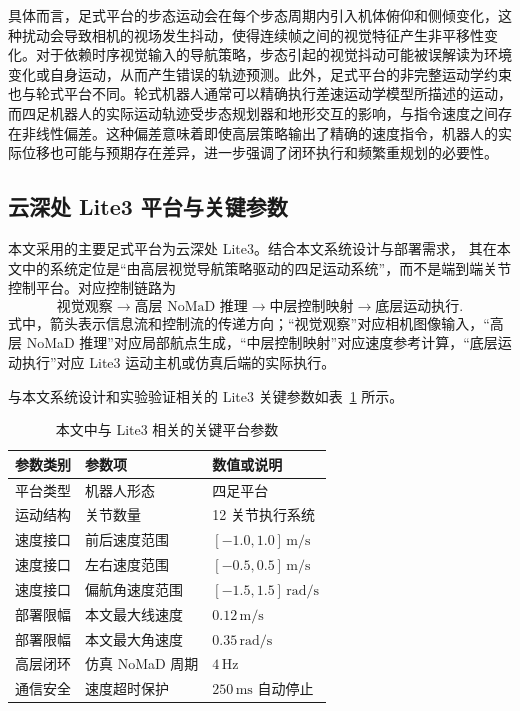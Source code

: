 具体而言，足式平台的步态运动会在每个步态周期内引入机体俯仰和侧倾变化，这种扰动会导致相机的视场发生抖动，使得连续帧之间的视觉特征产生非平移性变化。对于依赖时序视觉输入的导航策略，步态引起的视觉抖动可能被误解读为环境变化或自身运动，从而产生错误的轨迹预测。此外，足式平台的非完整运动学约束也与轮式平台不同。轮式机器人通常可以精确执行差速运动学模型所描述的运动，而四足机器人的实际运动轨迹受步态规划器和地形交互的影响，与指令速度之间存在非线性偏差。这种偏差意味着即使高层策略输出了精确的速度指令，机器人的实际位移也可能与预期存在差异，进一步强调了闭环执行和频繁重规划的必要性。


\subsection{云深处 Lite3 平台与关键参数}

本文采用的主要足式平台为云深处 Lite3。结合本文系统设计与部署需求，
其在本文中的系统定位是``由高层视觉导航策略驱动的四足运动系统''，而不是端到端关节控制平台。对应控制链路为
\begin{equation}
\text{视觉观察} \rightarrow \text{高层 NoMaD 推理} \rightarrow \text{中层控制映射} \rightarrow \text{底层运动执行}.
\end{equation}
式中，箭头表示信息流和控制流的传递方向；“视觉观察”对应相机图像输入，“高层 NoMaD 推理”对应局部航点生成，“中层控制映射”对应速度参考计算，“底层运动执行”对应 Lite3 运动主机或仿真后端的实际执行。

与本文系统设计和实验验证相关的 Lite3 关键参数如表~\ref{tab:lite3-params} 所示。
\begin{table}[htbp]
    \centering
    \caption{本文中与 Lite3 相关的关键平台参数}
    \label{tab:lite3-params}
    \begin{tabular}{lll}
        \toprule
        参数类别 & 参数项 & 数值或说明 \\
        \midrule
        平台类型 & 机器人形态 & 四足平台 \\
        运动结构 & 关节数量 & 12 关节执行系统 \\
        速度接口 & 前后速度范围 & $[-1.0,1.0]\,\text{m/s}$ \\
        速度接口 & 左右速度范围 & $[-0.5,0.5]\,\text{m/s}$ \\
        速度接口 & 偏航角速度范围 & $[-1.5,1.5]\,\text{rad/s}$ \\
        部署限幅 & 本文最大线速度 & $0.12\,\text{m/s}$ \\
        部署限幅 & 本文最大角速度 & $0.35\,\text{rad/s}$ \\
        高层闭环 & 仿真 NoMaD 周期 & $4\,\text{Hz}$ \\
        通信安全 & 速度超时保护 & $250\,\text{ms}$ 自动停止 \\
        \bottomrule
    \end{tabular}
\end{table}



